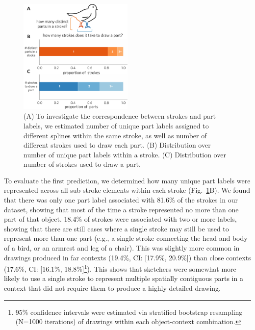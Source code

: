 \documentclass[10pt,letterpaper]{article}
\begin{document}
\begin{figure}[htbp]
\centering
\includegraphics[width=0.5\textwidth]{figures/5_stroke_part_relationship.pdf}
\caption{(A) To investigate the correspondence between strokes and part labels, we estimated number of unique part labels assigned to different splines within the same stroke, as well as number of different strokes used to draw each part. (B) Distribution over number of unique part labels within a stroke. (C) Distribution over number of strokes used to draw a part.}
\label{stroke_to_part}
\end{figure}

To evaluate the first prediction, we determined how many unique part labels were represented across all sub-stroke elements within each stroke (Fig.~\ref{stroke_to_part}B). 
We found that there was only one part label associated with 81.6\% of the strokes in our dataset, showing that most of the time a stroke represented no more than one part of that object. 
18.4\% of strokes were associated with two or more labels, showing that there are still cases where a single stroke may still be used to represent more than one part (e.g., a single stroke connecting the head and body of a bird, or an armrest and leg of a chair). 
This was slightly more common in drawings produced in far contexts (19.4\%, CI: [17.9\%, 20.9\%]) than close contexts (17.6\%, CI: [16.1\%, 18.8\%]\footnote{95\% confidence intervals were estimated via stratified bootstrap resampling (N=1000 iterations) of drawings within each object-context combination.}). 
This shows that sketchers were somewhat more likely to use a single stroke to represent multiple spatially contiguous parts in a context that did not require them to produce a highly detailed drawing.
\end{document}
